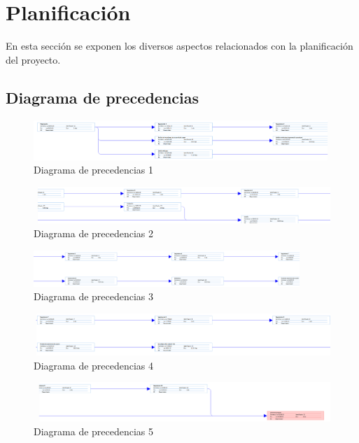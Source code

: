 \chapter{Planificación}

En esta sección se exponen los diversos aspectos relacionados con la planificación del proyecto.

\section{Diagrama de precedencias}

\begin{figure}[!htbp]
	\centering
	\includegraphics[scale=.3, angle=90]{fig/Red1}
	\caption{Diagrama de precedencias 1}
\end{figure}

\begin{figure}[!htbp]
	\centering
	\includegraphics[scale=.3, angle=90]{fig/Red2}
	\caption{Diagrama de precedencias 2}
\end{figure}

\begin{figure}[!htbp]
	\centering
	\includegraphics[scale=.3, angle=90]{fig/Red3}
	\caption{Diagrama de precedencias 3}
\end{figure}

\begin{figure}[!htbp]
	\centering
	\includegraphics[scale=.3, angle=90]{fig/Red4}
	\caption{Diagrama de precedencias 4}
\end{figure}

\begin{figure}[!htbp]
	\centering
	\includegraphics[scale=.3, angle=90]{fig/Red5}
	\caption{Diagrama de precedencias 5}
\end{figure}

